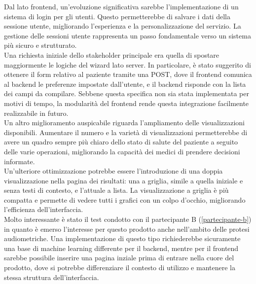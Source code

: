 Dal lato frontend, un'evoluzione significativa sarebbe l'implementazione di un sistema di login per gli utenti. Questo permetterebbe di salvare i dati della sessione utente, migliorando l'esperienza e la personalizzazione del servizio. La gestione delle sessioni utente rappresenta un passo fondamentale verso un sistema più sicuro e strutturato.\\
Una richiesta iniziale dello stakeholder principale era quella di spostare maggiormente le logiche del wizard lato server. In particolare, è stato suggerito di ottenere il form relativo al paziente tramite una POST, dove il frontend comunica al backend le preferenze impostate dall'utente, e il backend risponde con la lista dei campi da compilare. Sebbene questa specifica non sia stata implementata per motivi di tempo, la modularità del frontend rende questa integrazione facilmente realizzabile in futuro.\\
Un altro miglioramento auspicabile riguarda l'ampliamento delle visualizzazioni disponibili. Aumentare il numero e la varietà di visualizzazioni permetterebbe di avere un quadro sempre più chiaro dello stato di salute del paziente a seguito delle varie operazioni, migliorando la capacità dei medici di prendere decisioni informate.\\
Un'ulteriore ottimizzazione potrebbe essere l'introduzione di una doppia visualizzazione nella pagina dei risultati: una a griglia, simile a quella iniziale e senza testi di contesto, e l'attuale a lista. La visualizzazione a griglia è più compatta e permette di vedere tutti i grafici con un colpo d'occhio, migliorando l'efficienza dell'interfaccia.\\

Molto interessante è stato il test condotto con il partecipante B (\ref{partecipante-b}) in quanto è emerso l'interesse per questo prodotto anche nell'ambito delle protesi audiometriche. Una implementazione di questo tipo richiederebbe sicuramente una base di machine learning differente per il backend, mentre per il frontend sarebbe possibile inserire una pagina inziale prima di entrare nella cuore del prodotto, dove si potrebbe differenziare il contesto di utilizzo e mantenere la stessa struttura dell'interfaccia. 

